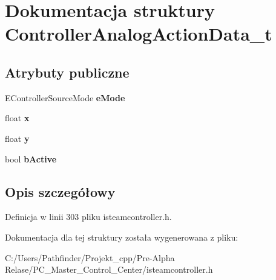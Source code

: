 \hypertarget{struct_controller_analog_action_data__t}{}\section{Dokumentacja struktury Controller\+Analog\+Action\+Data\+\_\+t}
\label{struct_controller_analog_action_data__t}
\subsection*{Atrybuty publiczne}
\begin{DoxyCompactItemize}
\item 
\mbox{\label{struct_controller_analog_action_data__t_a807ae57034da3818b0ff3ce78fcb67cb}} 
E\+Controller\+Source\+Mode {\bfseries e\+Mode}
\item 
\mbox{\label{struct_controller_analog_action_data__t_a7a1549b71f68780c922d6198a95f1b33}} 
float {\bfseries x}
\item 
\mbox{\label{struct_controller_analog_action_data__t_a36765f422de8a979d978d00207da3c6b}} 
float {\bfseries y}
\item 
\mbox{\label{struct_controller_analog_action_data__t_abc905e7f378368bc2eb69b85d98da155}} 
bool {\bfseries b\+Active}
\end{DoxyCompactItemize}


\subsection{Opis szczegółowy}


Definicja w linii 303 pliku isteamcontroller.\+h.



Dokumentacja dla tej struktury została wygenerowana z pliku\+:\begin{DoxyCompactItemize}
\item 
C\+:/\+Users/\+Pathfinder/\+Projekt\+\_\+cpp/\+Pre-\/\+Alpha Relase/\+P\+C\+\_\+\+Master\+\_\+\+Control\+\_\+\+Center/isteamcontroller.\+h\end{DoxyCompactItemize}
